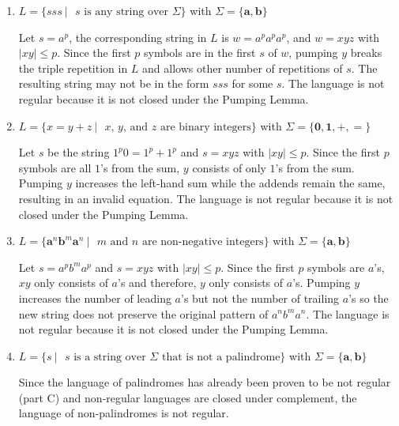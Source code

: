 \documentclass{article}
\begin{document}
\begin{enumerate}[label=\Alph*.]
    \item $L=\{sss\: |\text{ $s$ is any string over }\Sigma\}$ with $\Sigma=\{\mathbf{a}, \mathbf{b}\}$
    
    Let $s=a^p$, the corresponding string in $L$ is $w=a^p a^p a^p$, and $w=xyz$ with $|xy|\leq p$. Since the first $p$ symbols are in the first $s$ of $w$, pumping $y$ breaks the triple repetition in $L$ and allows other number of repetitions of $s$. The resulting string may not be in the form $sss$ for some $s$. The language is not regular because it is not closed under the Pumping Lemma.
    \item $L=\{x=y+z\:|\text{ $x$, $y$, and $z$ are binary integers}\}$ with $\Sigma=\{\mathbf{0},\mathbf{1},\mathbf{+},\mathbf{=}\}$
    
    Let $s$ be the string $1^p 0=1^p +1^p$ and $s=xyz$ with $|xy|\leq p$. Since the first $p$ symbols are all $1$'s from the sum, $y$ consists of only $1$'s from the sum. Pumping $y$ increases the left-hand sum while the addends remain the same, resulting in an invalid equation. The language is not regular because it is not closed under the Pumping Lemma.
    \item $L=\{\mathbf{a}^n\mathbf{b}^m\mathbf{a}^n\:|\text{ $m$ and $n$ are non-negative integers}\}$ with $\Sigma=\{\mathbf{a}, \mathbf{b}\}$

    Let $s=a^p b^m a^p$ and $s=xyz$ with $|xy|\leq p$. Since the first $p$ symbols are $a$'s, $xy$ only consists of $a$'s and therefore, $y$ only consists of $a$'s. Pumping $y$ increases the number of leading $a$'s but not the number of trailing $a$'s so the new string does not preserve the original pattern of $a^n b^m a^n$. The language is not regular because it is not closed under the Pumping Lemma.
    \item $L=\{s\:|\text{ $s$ is a string over $\Sigma$ that is not a palindrome}\}$ with $\Sigma=\{\mathbf{a}, \mathbf{b}\}$
    
    Since the language of palindromes has already been proven to be not regular (part C) and non-regular languages are closed under complement, the language of non-palindromes is not regular.
\end{enumerate}
\end{document}
